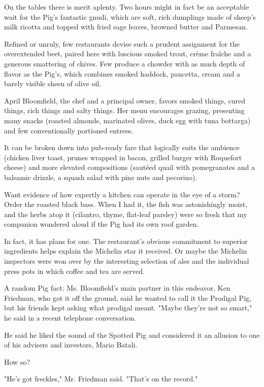 On the tables there is merit aplenty. Two hours might in fact be an
acceptable wait for the Pig's fantastic gnudi, which are soft, rich
dumplings made of sheep's milk ricotta and topped with fried sage
leaves, browned butter and Parmesan.

Refined or unruly, few restaurants devise such a prudent assignment for
the overextended beet, paired here with luscious smoked trout, crème
fraîche and a generous smattering of chives. Few produce a chowder with
as much depth of flavor as the Pig's, which combines smoked haddock,
pancetta, cream and a barely visible sheen of olive oil.

April Bloomfield, the chef and a principal owner, favors smoked things,
cured things, rich things and salty things. Her menu encourages grazing,
presenting many snacks (roasted almonds, marinated olives, duck egg with
tuna bottarga) and few conventionally portioned entrees.

It can be broken down into pub-ready fare that logically suits the
ambience (chicken liver toast, prunes wrapped in bacon, grilled burger
with Roquefort cheese) and more elevated compositions (sautéed quail
with pomegranates and a balsamic drizzle, a squash salad with pine nuts
and pecorino).

Want evidence of how expertly a kitchen can operate in the eye of a
storm? Order the roasted black bass. When I had it, the fish was
astonishingly moist, and the herbs atop it (cilantro, thyme, flat-leaf
parsley) were so fresh that my companion wondered aloud if the Pig had
its own roof garden.

In fact, it has plans for one. The restaurant's obvious commitment to
superior ingredients helps explain the Michelin star it received. Or
maybe the Michelin inspectors were won over by the interesting selection
of ales and the individual press pots in which coffee and tea are
served.

A random Pig fact: Ms. Bloomfield's main partner in this endeavor, Ken
Friedman, who got it off the ground, said he wanted to call it the
Prodigal Pig, but his friends kept asking what prodigal meant. "Maybe
they're not so smart," he said in a recent telephone conversation.

He said he liked the sound of the Spotted Pig and considered it an
allusion to one of his advisers and investors, Mario Batali.

How so?

"He's got freckles," Mr. Friedman said. "That's on the record."

